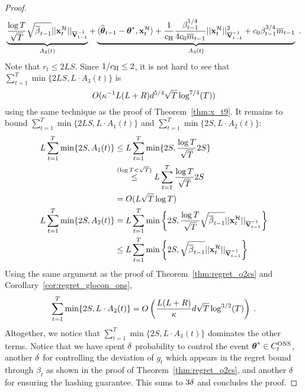 \begin{proof}
\begin{align*}
    \underbrace{{ \frac{\log T}{\sqrt{T}} } \sqrt{{\overline{\beta}}_{t-1}} || \mathbf{x}_t^{\mathcal{H}} ||_{\overline{\mathbf{V}}^{-1}_{t-1}} }_{A_2(t)}   + 
    \underbrace{{\langle} \widehat{\boldsymbol\theta}_{t-1} - {{\boldsymbol \theta}}^*, \mathbf{x}_t^{\mathcal{H}} {\rangle} + { \frac{1}{c_\text{\normalfont H}} }{ \frac{\beta_{t-1}^{1/4}}{4 c_0 \overline{m}_{t-1}} } { ||\mathbf{x}_t^{\mathcal{H}}||^2_{\overline{\mathbf{V}}^{-1}_{t-1}} } + c_0 \beta_{t-1}^{3/4} \overline{m}_{t-1} }_{A_3(t)} \;.
  \end{align*}
  Note that $r_t \le 2LS$.
  Since $1/c_\text{\normalfont H} \le 2$, it is not hard to see that $\sum_{t=1}^T \min\{2LS,L\cdot A_3(t)\}$ is 
    \[O( {\kappa}^{-1}L(L+R) d^{5/4} \sqrt{T} \log^{7/4}(T) )\] 
  using the same technique as the proof of Theorem~\ref{thm:x_t9}. 
  It remains to bound $\sum_{t=1}^T \min\{2LS,L\cdot A_1(t)\}$ and $\sum_{t=1}^T \min\{2S,L\cdot A_2(t)\}$:
  \begin{align*}
    L\sum_{t=1}^T \min\{2S,  A_1(t) \} &\le L\sum_{t=1}^T \min\{2S, { \frac{\log T}{\sqrt T} } 2S\} \\
    &\stackrel{(\log T < \sqrt{T})}{\le} L\sum_{t=1}^T  { \frac{\log T}{\sqrt T} } 2S   \\
    &= O(L\sqrt{T} \log T) \\
    L\sum_{t=1}^T \min\{2S, A_2(t) \}
    &= L\sum_{t=1}^T  \min\left\{ 2S, { \frac{\log T}{\sqrt T} } \sqrt{{\overline{\beta}}_{t-1}} || \mathbf{x}_t^{\mathcal{H}} ||_{\overline{\mathbf{V}}^{-1}_{t-1}} \right\} \\
    &\le L\sum_{t=1}^T  \min\left\{ 2S, \sqrt{{\overline{\beta}}_{t-1}} || \mathbf{x}_t^{\mathcal{H}} ||_{\overline{\mathbf{V}}^{-1}_{t-1}} \right\} \\
  \end{align*}
  Using the same argument as the proof of Theorem~\ref{thm:regret_o2cs} and Corollary~\ref{cor:regret_glocon_ons},
  \begin{align*}
    \sum_{t=1}^T \min\{2S,L\cdot A_2(t)\} = O\left({ \frac{L(L+R)}{{\kappa}} }d\sqrt{T}\log^{3/2}(T)\right)  \;.
  \end{align*}
  Altogether, we notice that $\sum_{t=1}^T \min\{2S,L\cdot A_3(t)\}$ dominates the other terms.
  Notice that we have spent ${\delta}$ probability to control the event ${{\boldsymbol \theta}}^* \in C^{{\text{\normalfont ONS}}}_t$, another ${\delta}$ for controlling the deviation of $g_t$ which appears in the regret bound through $\beta_t$ as shown in the proof of Theorem~\ref{thm:regret_o2cs}, and another ${\delta}$ for ensuring the hashing guarantee.
  This sums to $3{\delta}$ and concludes the proof.
\end{proof} 


\vspace{-5pt}

